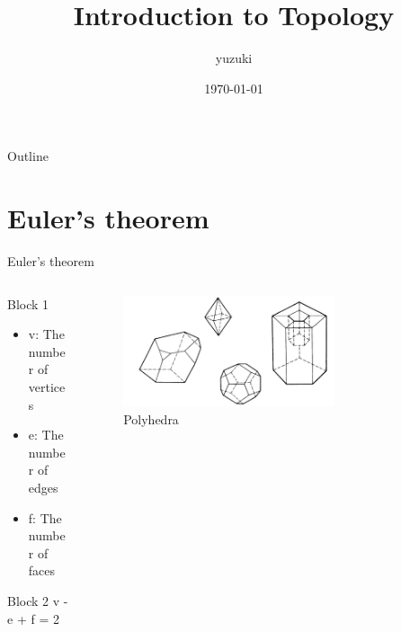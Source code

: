 \documentclass{beamer}
\title{Introduction to Topology}
\author{yuzuki}
\institute{Eyes, Japan}
\date{\today}
\begin{document}
\begin{frame}
    \titlepage
\end{frame}

\begin{frame}{Outline}
    \tableofcontents
\end{frame}


\section{Euler's theorem}

\begin{frame}{Euler's theorem}
\begin{columns}
\begin{column}{0.5\textwidth}
  \begin{block}{Block 1}
    \begin{itemize}
    \item v: The number of vertices
    \item e: The number of edges
    \item f: The number of faces
    \end{itemize}
  \end{block}
  \begin{block}{Block 2}
    v - e + f = 2
  \end{block}
\end{column}
\begin{column}{0.5\textwidth}
    \begin{figure}
    \centering
        \includegraphics[width=0.7\textwidth]{figure_1_1.png}
        \caption{Polyhedra}
    \end{figure}
\end{column}
\end{columns}
\end{frame}
\end{document}
